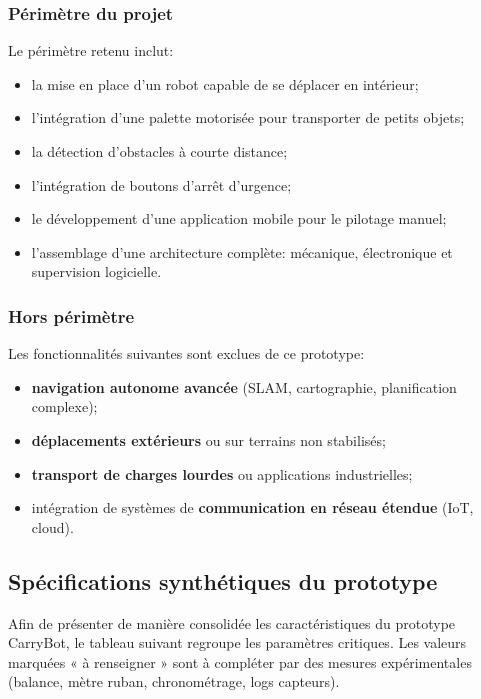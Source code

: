 \documentclass[12pt,a4paper]{article}
\begin{document}
\subsubsection{Périmètre du projet}
Le périmètre retenu inclut:
\begin{itemize}
    \item la mise en place d’un robot capable de se déplacer en intérieur;
    \item l’intégration d’une palette motorisée pour transporter de petits objets;
    \item la détection d’obstacles à courte distance;
    \item l’intégration de boutons d’arrêt d’urgence;
    \item le développement d’une application mobile pour le pilotage manuel;
    \item l’assemblage d’une architecture complète: mécanique, électronique et supervision logicielle.
\end{itemize}

\subsubsection{Hors périmètre}
Les fonctionnalités suivantes sont exclues de ce prototype:
\begin{itemize}
    \item \textbf{navigation autonome avancée} (SLAM, cartographie, planification complexe);
    \item \textbf{déplacements extérieurs} ou sur terrains non stabilisés;
    \item \textbf{transport de charges lourdes} ou applications industrielles;
    \item intégration de systèmes de \textbf{communication en réseau étendue} (IoT, cloud).
\end{itemize}


\subsection*{Spécifications synthétiques du prototype}

Afin de présenter de manière consolidée les caractéristiques du prototype CarryBot, le tableau
suivant regroupe les paramètres critiques. Les valeurs marquées « à renseigner » sont à compléter
par des mesures expérimentales (balance, mètre ruban, chronométrage, logs capteurs).
\end{document}
